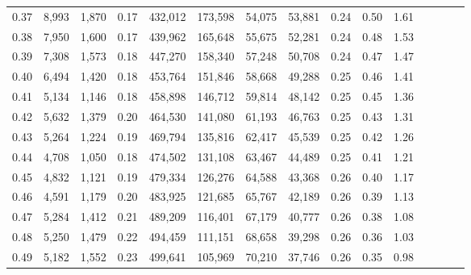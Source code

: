 \begin{tabular}{rrrcrrrrrrrrrrr}
0.37 &   8,993 &  1,870 &                                       0.17 &  432,012 &  173,598 &   54,075 &   53,881 &  0.24 &  0.50 &                         1.61 \\
0.38 &   7,950 &  1,600 &                                       0.17 &  439,962 &  165,648 &   55,675 &   52,281 &  0.24 &  0.48 &                         1.53 \\
0.39 &   7,308 &  1,573 &                                       0.18 &  447,270 &  158,340 &   57,248 &   50,708 &  0.24 &  0.47 &                         1.47 \\
0.40 &   6,494 &  1,420 &                                       0.18 &  453,764 &  151,846 &   58,668 &   49,288 &  0.25 &  0.46 &                         1.41 \\
0.41 &   5,134 &  1,146 &                                       0.18 &  458,898 &  146,712 &   59,814 &   48,142 &  0.25 &  0.45 &                         1.36 \\
0.42 &   5,632 &  1,379 &                                       0.20 &  464,530 &  141,080 &   61,193 &   46,763 &  0.25 &  0.43 &                         1.31 \\
0.43 &   5,264 &  1,224 &                                       0.19 &  469,794 &  135,816 &   62,417 &   45,539 &  0.25 &  0.42 &                         1.26 \\
0.44 &   4,708 &  1,050 &                                       0.18 &  474,502 &  131,108 &   63,467 &   44,489 &  0.25 &  0.41 &                         1.21 \\
0.45 &   4,832 &  1,121 &                                       0.19 &  479,334 &  126,276 &   64,588 &   43,368 &  0.26 &  0.40 &                         1.17 \\
0.46 &   4,591 &  1,179 &                                       0.20 &  483,925 &  121,685 &   65,767 &   42,189 &  0.26 &  0.39 &                         1.13 \\
0.47 &   5,284 &  1,412 &                                       0.21 &  489,209 &  116,401 &   67,179 &   40,777 &  0.26 &  0.38 &                         1.08 \\
0.48 &   5,250 &  1,479 &                                       0.22 &  494,459 &  111,151 &   68,658 &   39,298 &  0.26 &  0.36 &                         1.03 \\
0.49 &   5,182 &  1,552 &                                       0.23 &  499,641 &  105,969 &   70,210 &   37,746 &  0.26 &  0.35 &                         0.98 \\

\end{tabular}
